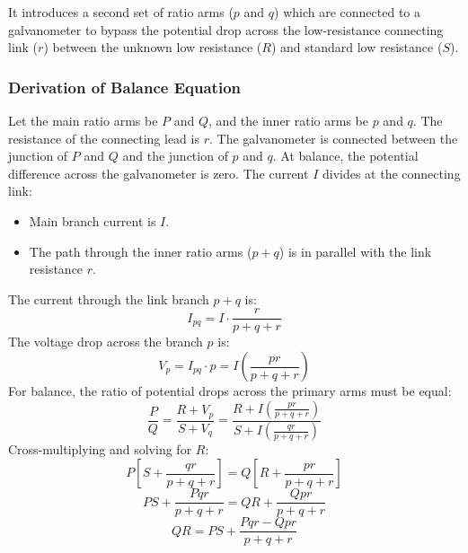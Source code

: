 \documentclass[12pt,a4paper]{article}
\begin{document}
\begin{tcolorbox}[defbox, title={\textbf{Kelvin Double Bridge Concept}}]
It introduces a second set of ratio arms ($p$ and $q$) which are connected to a galvanometer to bypass the potential drop across the low-resistance connecting link ($r$) between the unknown low resistance ($R$) and standard low resistance ($S$).
\end{tcolorbox}

\subsubsection{Derivation of Balance Equation}
Let the main ratio arms be $P$ and $Q$, and the inner ratio arms be $p$ and $q$. The resistance of the connecting lead is $r$.
The galvanometer is connected between the junction of $P$ and $Q$ and the junction of $p$ and $q$. At balance, the potential difference across the galvanometer is zero.
The current $I$ divides at the connecting link:
\begin{itemize}[leftmargin=*, itemsep=3pt]
  \item Main branch current is $I$.
  \item The path through the inner ratio arms ($p+q$) is in parallel with the link resistance $r$.
\end{itemize}
The current through the link branch $p+q$ is:
\begin{equation}
  I_{pq} = I \cdot \frac{r}{p + q + r}
\end{equation}
The voltage drop across the branch $p$ is:
\begin{equation}
  V_p = I_{pq} \cdot p = I \left( \frac{p r}{p + q + r} \right)
\end{equation}
For balance, the ratio of potential drops across the primary arms must be equal:
\begin{equation}
  \frac{P}{Q} = \frac{R + V_p}{S + V_q} = \frac{R + I \left(\frac{p r}{p + q + r}\right)}{S + I \left(\frac{q r}{p + q + r}\right)}
\end{equation}
Cross-multiplying and solving for $R$:
\begin{equation}
  P \left[ S + \frac{q r}{p + q + r} \right] = Q \left[ R + \frac{p r}{p + q + r} \right]
\end{equation}
\begin{equation}
  P S + \frac{P q r}{p + q + r} = Q R + \frac{Q p r}{p + q + r}
\end{equation}
\begin{equation}
  Q R = P S + \frac{P q r - Q p r}{p + q + r}
\end{equation}
\end{document}
